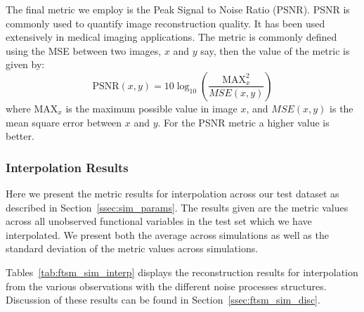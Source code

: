 The final metric we employ is the Peak Signal to Noise Ratio (PSNR). 
PSNR is commonly used to quantify image reconstruction quality. 
It has been used extensively in medical imaging applications.
The metric is commonly defined using the MSE between two images, $x$ and $y$ say, then the value of the metric is given by:
\begin{equation}
	\text{PSNR}(x, y) = 10 \log_{10}\left(\frac{\text{MAX}^2_x}{MSE(x,y)}\right)
\end{equation}
where $\text{MAX}_x$ is the maximum possible value in image $x$, and $MSE(x,y)$ is the mean square error between $x$ and $y$.  
For the PSNR metric a higher value is better. 

\subsubsection{Interpolation Results}
Here we present the metric results for interpolation across our test dataset as described in Section~\ref{ssec:sim_params}.
The results given are the metric values across all unobserved functional variables in the test set which we have interpolated.
We present both the average across simulations as well as the standard deviation of the metric values across simulations.

Tables~\ref{tab:ftsm_sim_interp} displays the reconstruction results for interpolation from the various observations with the different noise processes structures. 
Discussion of these results can be found in Section~\ref{ssec:ftsm_sim_disc}. 

